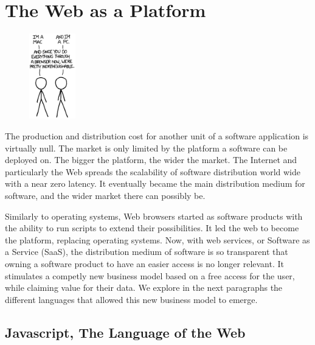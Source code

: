 \section{The Web as a Platform} \label{chapter2:web-as-a-platform}

\begin{figure}
  \vspace{-27pt}
  \begin{center}
    \includegraphics[width=0.18\textwidth]{../ressources/Mac-PC.png}
  \end{center}
  \vspace{-20pt}
\end{figure}


The production and distribution cost for another unit of a software application is virtually null.
The market is only limited by the platform a software can be deployed on.
The bigger the platform, the wider the market.
The Internet and particularly the Web spreads the scalability of software distribution world wide with a near zero latency.
It eventually became the main distribution medium for software, and the wider market there can possibly be.

Similarly to operating systems, Web browsers started as software products with the ability to run scripts to extend their possibilities.
It led the web to become the platform, replacing operating systems.
Now, with web services, or Software as a Service (SaaS), the distribution medium of software is so transparent that owning a software product to have an easier access is no longer relevant.
It stimulates a competly new business model based on a free access for the user, while claiming value for their data.
We explore in the next paragraphs the different languages that allowed this new business model to emerge.

\subsection{Javascript, The Language of the Web}

